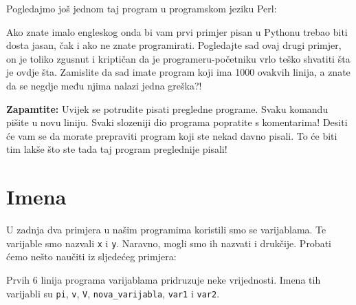 	Pogledajmo još jednom taj program u programskom jeziku Perl:


	Ako znate imalo engleskog onda bi vam prvi primjer pisan u Pythonu trebao biti
	dosta jasan, čak i ako ne znate programirati. Pogledajte sad ovaj drugi
	primjer, on je toliko zgusnut i kriptičan da je programeru-početniku vrlo
	teško shvatiti šta je ovdje šta. Zamislite da sad imate program koji
	ima 1000 ovakvih linija, a znate da se negdje među njima nalazi jedna
	greška?!

	\textbf{Zapamtite:} Uvijek se potrudite pisati pregledne programe. Svaku komandu
	pišite u novu liniju. Svaki slozeniji dio programa popratite s komentarima!
	Desiti će vam se da morate prepraviti program koji ste nekad davno pisali. To
	će biti tim lakše što ste tada taj program preglednije pisali!
	
\section{Imena}

	U zadnja dva primjera u našim programima koristili smo se varijablama. Te
	varijable smo nazvali \verb+x+ i \verb+y+. Naravno, mogli smo ih nazvati i
	drukčije. Probati ćemo nešto naučiti iz sljedećeg primjera:


	Prvih 6 linija programa varijablama pridruzuje neke vrijednosti. Imena tih
	varijabli su 
	\verb+pi+,
	\verb+v+,
	\verb+V+,
	\verb+nova_varijabla+,
	\verb+var1+ i 
	\verb+var2+.

